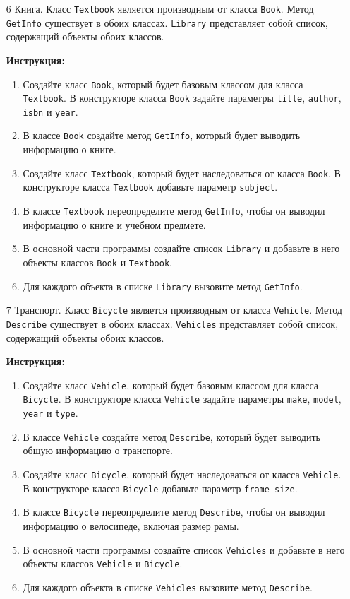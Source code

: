 \begin{enumerate}
\item[6]
Книга. Класс \texttt{Textbook} является производным от класса \texttt{Book}. Метод \texttt{GetInfo} существует в обоих классах. \texttt{Library} представляет собой список, содержащий объекты обоих классов.

\textbf{Инструкция:}
\begin{enumerate}
    \item Создайте класс \texttt{Book}, который будет базовым классом для класса \texttt{Textbook}. В конструкторе класса \texttt{Book} задайте параметры \texttt{title}, \texttt{author}, \texttt{isbn} и \texttt{year}.
    \item В классе \texttt{Book} создайте метод \texttt{GetInfo}, который будет выводить информацию о книге.
    \item Создайте класс \texttt{Textbook}, который будет наследоваться от класса \texttt{Book}. В конструкторе класса \texttt{Textbook} добавьте параметр \texttt{subject}.
    \item В классе \texttt{Textbook} переопределите метод \texttt{GetInfo}, чтобы он выводил информацию о книге и учебном предмете.
    \item В основной части программы создайте список \texttt{Library} и добавьте в него объекты классов \texttt{Book} и \texttt{Textbook}.
    \item Для каждого объекта в списке \texttt{Library} вызовите метод \texttt{GetInfo}.
\end{enumerate}

\item[7]
Транспорт. Класс \texttt{Bicycle} является производным от класса \texttt{Vehicle}. Метод \texttt{Describe} существует в обоих классах. \texttt{Vehicles} представляет собой список, содержащий объекты обоих классов.

\textbf{Инструкция:}
\begin{enumerate}
    \item Создайте класс \texttt{Vehicle}, который будет базовым классом для класса \texttt{Bicycle}. В конструкторе класса \texttt{Vehicle} задайте параметры \texttt{make}, \texttt{model}, \texttt{year} и \texttt{type}.
    \item В классе \texttt{Vehicle} создайте метод \texttt{Describe}, который будет выводить общую информацию о транспорте.
    \item Создайте класс \texttt{Bicycle}, который будет наследоваться от класса \texttt{Vehicle}. В конструкторе класса \texttt{Bicycle} добавьте параметр \texttt{frame\_size}.
    \item В классе \texttt{Bicycle} переопределите метод \texttt{Describe}, чтобы он выводил информацию о велосипеде, включая размер рамы.
    \item В основной части программы создайте список \texttt{Vehicles} и добавьте в него объекты классов \texttt{Vehicle} и \texttt{Bicycle}.
    \item Для каждого объекта в списке \texttt{Vehicles} вызовите метод \texttt{Describe}.
\end{enumerate}


\end{enumerate}
